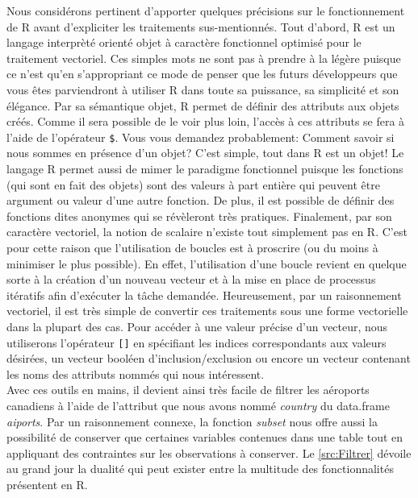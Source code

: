 \noindent
Nous considérons pertinent d'apporter quelques précisions sur le fonctionnement de R avant d'expliciter les traitements sus-mentionnés. Tout d'abord, R est un langage interprèté orienté objet à caractère fonctionnel optimisé pour le traitement vectoriel. Ces simples mots ne sont pas à prendre à la légère puisque ce n'est qu'en s'appropriant ce mode de penser que les futurs développeurs que vous êtes parviendront à utiliser R dans toute sa puissance, sa simplicité et son élégance. Par sa sémantique objet, R permet de définir des attributs aux objets créés. Comme il sera possible de le voir plus loin, l'accès à ces attributs se fera à l'aide de l'opérateur \texttt{\$}. Vous vous demandez probablement: Comment savoir si nous sommes en présence d'un objet? C'est simple, tout dans R est un objet! Le langage R permet aussi de mimer le paradigme fonctionnel puisque les fonctions (qui sont en fait des objets) sont des valeurs à part entière qui peuvent être argument ou valeur d'une autre fonction. De plus, il est possible de définir des fonctions dites anonymes qui se révèleront très pratiques. Finalement, par son caractère vectoriel, la notion de scalaire n'existe tout simplement pas en R. C'est pour cette raison que l'utilisation de boucles est à proscrire (ou du moins à minimiser le plus possible). En effet, l'utilisation d'une boucle revient en quelque sorte à la création d'un nouveau vecteur et à la mise en place de processus itératifs afin d'exécuter la tâche demandée. Heureusement, par un raisonnement vectoriel, il est très simple de convertir ces traitements sous une forme vectorielle dans la plupart des cas. \cite{Goulet} Pour accéder à une valeur précise d'un vecteur, nous utiliserons l'opérateur \texttt{[]} en spécifiant les indices correspondants aux valeurs désirées, un vecteur booléen d'inclusion/exclusion ou encore un vecteur contenant les noms des attributs nommés qui nous intéressent. \\

\noindent
Avec ces outils en mains, il devient ainsi très facile de filtrer les aéroports canadiens à l'aide de l'attribut que nous avons nommé \emph{country} du data.frame \emph{aiports}. Par un raisonnement connexe, la fonction \emph{subset} nous offre aussi la possibilité de conserver que certaines variables contenues dans une table tout en appliquant des contraintes sur les observations à conserver. Le \autoref{src:Filtrer} dévoile au grand jour la dualité qui peut exister entre la multitude des fonctionnalités présentent en R. \\

